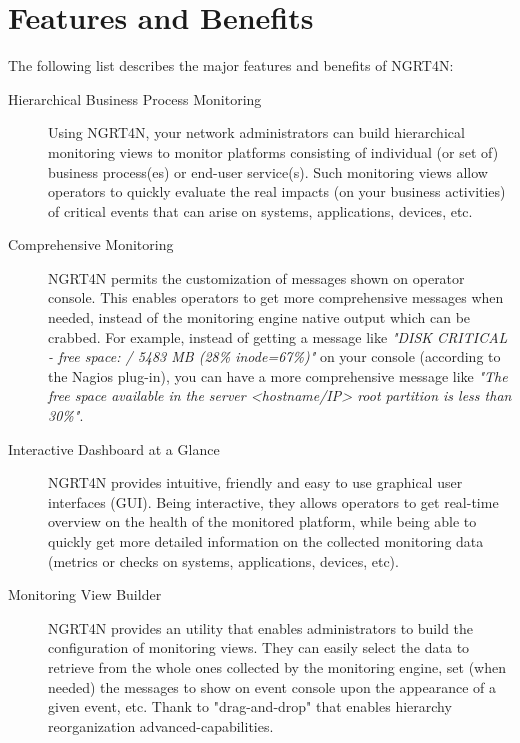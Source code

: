 \documentclass[a4paper,9pt]{article}
\begin{document}

\section{Features and Benefits}
The following list describes the major features and benefits of NGRT4N:

\begin{description}
        \item [Hierarchical Business Process Monitoring]
        Using NGRT4N, your network administrators can build hierarchical monitoring views to monitor platforms consisting of individual (or set of) business process(es) or end-user service(s). Such monitoring views allow operators to quickly evaluate the real impacts (on your business activities) of critical events that can arise on systems, applications, devices, etc.     
        \item [Comprehensive Monitoring]
        NGRT4N permits the customization of messages shown on operator console. This enables operators to get more comprehensive messages when needed, instead of the monitoring engine native output which can be crabbed. For example, instead of getting a message like \emph{"DISK CRITICAL - free space: / 5483 MB (28\% inode=67\%)"} on your console (according to the Nagios plug-in), you can have a more comprehensive message like \emph{"The free space available in the server <hostname/IP> root partition is less than 30\%"}.
        \item [Interactive Dashboard at a Glance]
        NGRT4N provides intuitive, friendly and easy to use graphical user interfaces (GUI). Being interactive, they allows operators to get real-time overview on the health of the monitored platform, while being able to quickly get more detailed information on the collected monitoring data (metrics or checks on systems, applications, devices, etc).  
        \item [Monitoring View Builder] 
        NGRT4N provides an utility that enables administrators to build the configuration of monitoring views. They can easily select the data to retrieve from the whole ones collected by the monitoring engine, set (when needed) the messages to show on event console upon the appearance of a given event, etc. Thank to "drag-and-drop" that enables hierarchy reorganization advanced-capabilities.

\end{description}
\end{document}
